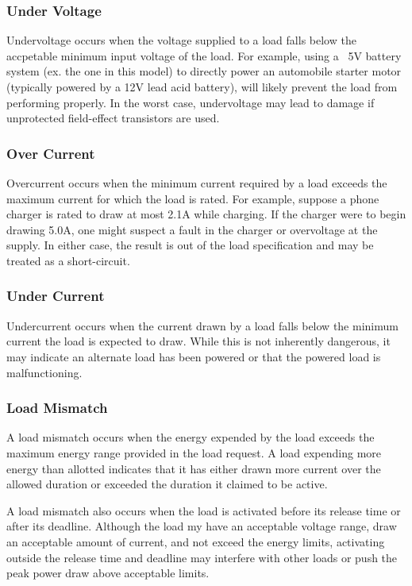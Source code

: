 \documentclass[11pt,conference,draftcls,onecolumn]{IEEEtran}
\begin{document}
\subsubsection{Under Voltage}
Undervoltage occurs when the voltage supplied to a load falls below the accpetable minimum input voltage of the load.
For example, using a ~5V battery system (ex. the one in this model) to directly power an automobile starter motor (typically powered by a 12V lead acid battery), will likely prevent the load from performing properly.
In the worst case, undervoltage may lead to damage if unprotected field-effect transistors are used.

\subsubsection{Over Current}
Overcurrent occurs when the minimum current required by a load exceeds the maximum current for which the load is rated.
For example, suppose a phone charger is rated to draw at most 2.1A while charging.
If the charger were to begin drawing 5.0A, one might suspect a fault in the charger or overvoltage at the supply.
In either case, the result is out of the load specification and may be treated as a short-circuit.

\subsubsection{Under Current}
Undercurrent occurs when the current drawn by a load falls below the minimum current the load is expected to draw.
While this is not inherently dangerous, it may indicate an alternate load has been powered or that the powered load is malfunctioning.

\subsubsection{Load Mismatch}
A load mismatch occurs when the energy expended by the load exceeds the maximum energy range provided in the load request.
A load expending more energy than allotted indicates that it has either drawn more current over the allowed duration or exceeded the duration it claimed to be active.

A load mismatch also occurs when the load is activated before its release time or after its deadline. 
Although the load my have an acceptable voltage range, draw an acceptable amount of current, and not exceed the energy limits, activating outside the release time and deadline may interfere with other loads or push the peak power draw above acceptable limits.
\end{document}
